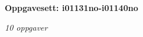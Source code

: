 \centerline{\bf Oppgavesett: i01131no-i01140no}
\vskip 10pt
\centerline{\it 10 oppgaver}\vskip 10pt
\vskip 10pt
